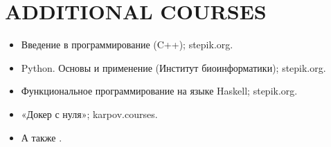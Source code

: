\section{ADDITIONAL COURSES}

    \begin{itemize}
        \setlength\itemsep{-.5em}
        \item Введение в программирование (C++); stepik.org.
        \item Python. Основы и применение (Институт биоинформатики); stepik.org.
        \item Функциональное программирование на языке Haskell; stepik.org.
        \item «Докер с нуля»; karpov.courses.
        \item А также .
    \end{itemize}
    
    \vspace{-.4em}
